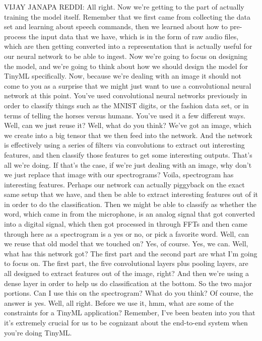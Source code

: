 VIJAY JANAPA REDDI: All right.
Now we're getting to the part of actually training the model itself.
Remember that we first came from collecting the data set
and learning about speech commands, then we
learned about how to pre-process the input data that we have,
which is in the form of raw audio files, which are then getting converted
into a representation that is actually useful for our neural network
to be able to ingest.
Now we're going to focus on designing the model,
and we're going to think about how we should design the model for TinyML
specifically.
Now, because we're dealing with an image it should not come to you as a surprise
that we might just want to use a convolutional neural network
at this point.
You've used convolutional neural networks previously
in order to classify things such as the MNIST digits, or the fashion data set,
or in terms of telling the horses versus humans.
You've used it a few different ways.
Well, can we just reuse it?
Well, what do you think?
We've got an image, which we create into a big tensor
that we then feed into the network.
And the network is effectively using a series of filters via convolutions
to extract out interesting features, and then
classify those features to get some interesting outputs.
That's all we're doing.
If that's the case, if we're just dealing with an image,
why don't we just replace that image with our spectrograms?
Voila, spectrogram has interesting features.
Perhaps our network can actually piggyback on the exact same setup
that we have, and then be able to extract interesting features out of it
in order to do the classification.
Then we might be able to classify as whether the word, which came in
from the microphone, is an analog signal that
got converted into a digital signal, which then got
processed in through FFTs and then came through here
as a spectrogram is a yes or no, or pick a favorite word.
Well, can we reuse that old model that we touched on?
Yes, of course.
Yes, we can.
Well, what has this network got?
The first part and the second part are what I'm going to focus on.
The first part, the five convolutional layers plus pooling layers,
are all designed to extract features out of the image, right?
And then we're using a dense layer in order
to help us do classification at the bottom.
So the two major portions.
Can I use this on the spectrogram?
What do you think?
Of course, the answer is yes.
Well, all right.
Before we use it, hmm, what are some of the constraints for a TinyML
application?
Remember, I've been beaten into you that it's extremely crucial for us
to be cognizant about the end-to-end system when you're doing TinyML.
